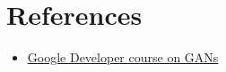 \documentclass[11pt]{article}
\begin{document}


    \section{References}
    \begin{itemize}
        \item \href{https://developers.google.com/machine-learning/gan}{Google Developer course on GANs}
    \end{itemize}
\end{document}

